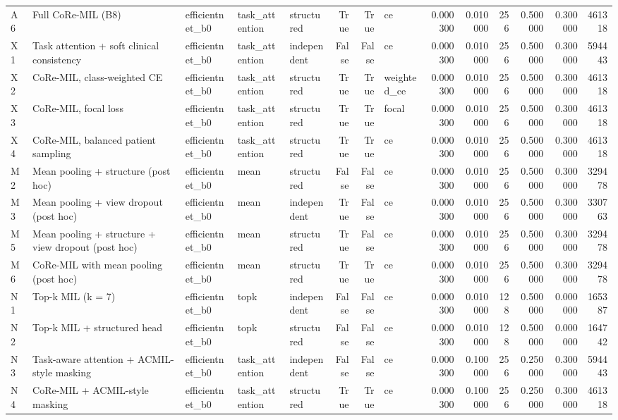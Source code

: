 \begin{table}
\begin{tabular}{lllllrrlrrrrrr}
A6 & Full CoRe-MIL (B8) & efficientnet\_b0 & task\_attention & structured & True & True & ce & 0.000300 & 0.010000 & 256 & 0.500000 & 0.300000 & 461318 \\
X1 & Task attention + soft clinical consistency & efficientnet\_b0 & task\_attention & independent & False & False & ce & 0.000300 & 0.010000 & 256 & 0.500000 & 0.300000 & 594443 \\
X2 & CoRe-MIL, class-weighted CE & efficientnet\_b0 & task\_attention & structured & True & True & weighted\_ce & 0.000300 & 0.010000 & 256 & 0.500000 & 0.300000 & 461318 \\
X3 & CoRe-MIL, focal loss & efficientnet\_b0 & task\_attention & structured & True & True & focal & 0.000300 & 0.010000 & 256 & 0.500000 & 0.300000 & 461318 \\
X4 & CoRe-MIL, balanced patient sampling & efficientnet\_b0 & task\_attention & structured & True & True & ce & 0.000300 & 0.010000 & 256 & 0.500000 & 0.300000 & 461318 \\
M2 & Mean pooling + structure (post hoc) & efficientnet\_b0 & mean & structured & False & False & ce & 0.000300 & 0.010000 & 256 & 0.500000 & 0.300000 & 329478 \\
M3 & Mean pooling + view dropout (post hoc) & efficientnet\_b0 & mean & independent & True & False & ce & 0.000300 & 0.010000 & 256 & 0.500000 & 0.300000 & 330763 \\
M5 & Mean pooling + structure + view dropout (post hoc) & efficientnet\_b0 & mean & structured & True & False & ce & 0.000300 & 0.010000 & 256 & 0.500000 & 0.300000 & 329478 \\
M6 & CoRe-MIL with mean pooling (post hoc) & efficientnet\_b0 & mean & structured & True & True & ce & 0.000300 & 0.010000 & 256 & 0.500000 & 0.300000 & 329478 \\
N1 & Top-k MIL (k = 7) & efficientnet\_b0 & topk & independent & False & False & ce & 0.000300 & 0.010000 & 128 & 0.500000 & 0.000000 & 165387 \\
N2 & Top-k MIL + structured head & efficientnet\_b0 & topk & structured & False & False & ce & 0.000300 & 0.010000 & 128 & 0.500000 & 0.000000 & 164742 \\
N3 & Task-aware attention + ACMIL-style masking & efficientnet\_b0 & task\_attention & independent & False & False & ce & 0.000300 & 0.100000 & 256 & 0.250000 & 0.300000 & 594443 \\
N4 & CoRe-MIL + ACMIL-style masking & efficientnet\_b0 & task\_attention & structured & True & True & ce & 0.000300 & 0.100000 & 256 & 0.250000 & 0.300000 & 461318 \\

\end{tabular}
\end{table}
